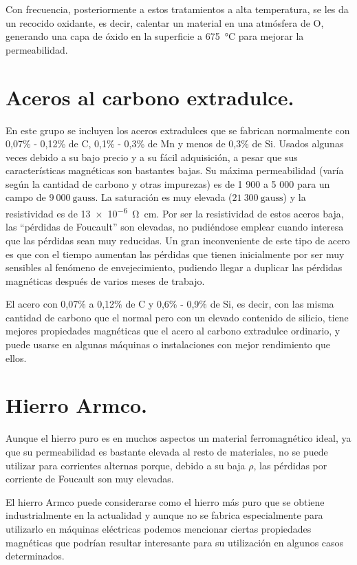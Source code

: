 \documentclass[12pt,a4paper]{article}
\begin{document}
Con frecuencia, posteriormente a estos tratamientos a alta temperatura, se les da un recocido oxidante, es decir, calentar un material en una atmósfera de O, generando una capa de óxido en la superficie a \SI{675}{\celsius} para mejorar la permeabilidad.

\section{Aceros al carbono extradulce.}

En este grupo se incluyen los aceros extradulces que se fabrican normalmente con 0,07\% - 0,12\% de C, 0,1\% - 0,3\% de Mn y menos de 0,3\% de Si. Usados algunas veces debido a su bajo precio y a su fácil adquisición, a pesar que sus características magnéticas son bastantes bajas. Su máxima permeabilidad (varía según la cantidad de carbono y otras impurezas) es de 1 900 a 5 000 para un campo de $9\ 000 \ \mathrm{gauss}$. La saturación es muy elevada ($21\ 300 \ \mathrm{gauss}$) y la resistividad es de \SI{13e-6}{\ohm\centi\meter}. Por ser la resistividad de estos aceros baja, las \enquote{pérdidas de Foucault} son elevadas, no pudiéndose emplear cuando interesa que las pérdidas sean muy reducidas. Un gran inconveniente de este tipo de acero es que con el tiempo aumentan las pérdidas que tienen inicialmente por ser muy sensibles al fenómeno de envejecimiento, pudiendo llegar a duplicar las pérdidas magnéticas después de varios meses de trabajo.

El acero con 0,07\% a 0,12\% de C y 0,6\% - 0,9\% de Si, es decir, con las misma cantidad de carbono que el normal pero con un elevado contenido de silicio, tiene mejores propiedades magnéticas que el acero al carbono extradulce ordinario, y puede usarse en algunas máquinas o instalaciones con mejor rendimiento que ellos.

\section{Hierro Armco.}

Aunque el hierro puro es en muchos aspectos un material ferromagnético ideal, ya que su permeabilidad es bastante elevada al resto de materiales, no se puede utilizar para corrientes alternas porque, debido a su baja $\rho$, las pérdidas por corriente de Foucault son muy elevadas.

El hierro Armco puede considerarse como el hierro más puro que se obtiene industrialmente en la actualidad y aunque no se fabrica especialmente para utilizarlo en máquinas eléctricas podemos mencionar ciertas propiedades magnéticas que podrían resultar interesante para su utilización en algunos casos determinados.
\end{document}

